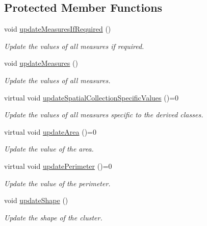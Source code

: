 \subsection*{Protected Member Functions}
\begin{DoxyCompactItemize}
\item 
void \hyperlink{classmultiscale_1_1analysis_1_1SpatialCollection2D_a731de1009ba24b4fda5003c9cec5196c}{update\-Measures\-If\-Required} ()
\begin{DoxyCompactList}\small\item\em Update the values of all measures if required. \end{DoxyCompactList}\item 
void \hyperlink{classmultiscale_1_1analysis_1_1SpatialCollection2D_a8e5a2af581895142da9b50eeeabeb7be}{update\-Measures} ()
\begin{DoxyCompactList}\small\item\em Update the values of all measures. \end{DoxyCompactList}\item 
virtual void \hyperlink{classmultiscale_1_1analysis_1_1SpatialCollection2D_ad94bce09032b184ebfd5b5006217c683}{update\-Spatial\-Collection\-Specific\-Values} ()=0
\begin{DoxyCompactList}\small\item\em Update the values of all measures specific to the derived classes. \end{DoxyCompactList}\item 
virtual void \hyperlink{classmultiscale_1_1analysis_1_1SpatialCollection2D_a160aae10901ef5198db1b03bdef68065}{update\-Area} ()=0
\begin{DoxyCompactList}\small\item\em Update the value of the area. \end{DoxyCompactList}\item 
virtual void \hyperlink{classmultiscale_1_1analysis_1_1SpatialCollection2D_a6751a928c631fe725a2e7c5226e3720b}{update\-Perimeter} ()=0
\begin{DoxyCompactList}\small\item\em Update the value of the perimeter. \end{DoxyCompactList}\item 
void \hyperlink{classmultiscale_1_1analysis_1_1SpatialCollection2D_ab26bc346c1b0b0d17104c7d5cfb170bb}{update\-Shape} ()
\begin{DoxyCompactList}\small\item\em Update the shape of the cluster. \end{DoxyCompactList}\item 

\end{DoxyCompactItemize}
